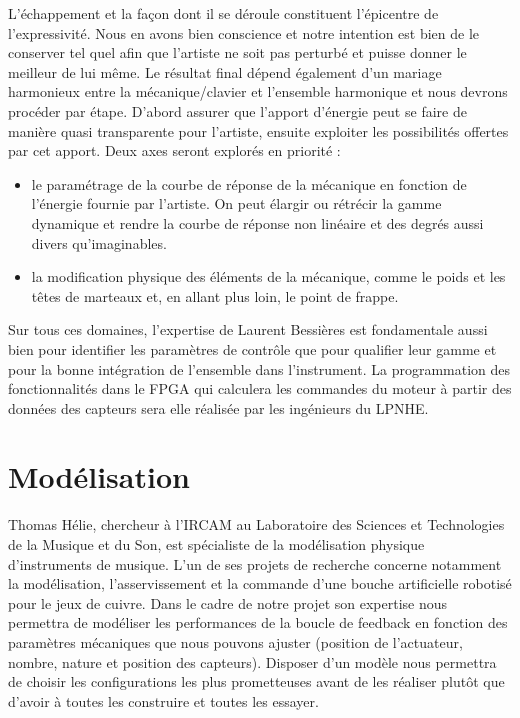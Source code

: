 \documentclass[french,a4paper,12pt]{report}
\begin{document}
L’échappement et la façon dont il se déroule constituent l’épicentre de l’expressivité. Nous en avons bien conscience et notre intention est bien de le conserver tel quel afin que l’artiste ne soit pas perturbé et puisse donner le meilleur de lui même. Le résultat final dépend également d’un mariage harmonieux entre la mécanique/clavier et l’ensemble harmonique et nous devrons procéder par étape. D’abord assurer que l’apport d’énergie peut se faire de manière quasi transparente pour l’artiste, ensuite exploiter les possibilités offertes par cet apport. Deux axes seront explorés en priorité :

\begin{itemize}
\item  le paramétrage de la courbe de réponse de la mécanique en fonction de l’énergie fournie par l’artiste. On peut élargir ou rétrécir la gamme dynamique et rendre la courbe de réponse non linéaire et des degrés aussi divers qu'imaginables.

\item  la modification physique des éléments de la mécanique, comme le poids et les têtes de marteaux et, en allant plus loin, le point de frappe.
\end{itemize}

Sur tous ces domaines, l’expertise de Laurent Bessières est fondamentale aussi bien pour identifier les paramètres de contrôle que pour qualifier leur gamme et pour la bonne intégration de l’ensemble dans l’instrument. La programmation des fonctionnalités dans le FPGA qui calculera les commandes du moteur à partir des données des capteurs sera elle réalisée par les ingénieurs du LPNHE.

\newpage

  \section{Modélisation}

Thomas Hélie, chercheur à l’IRCAM au Laboratoire des Sciences et Technologies de la Musique et du Son, est spécialiste de la modélisation physique d’instruments de musique. L’un de ses projets de recherche concerne notamment la modélisation, l’asservissement et la commande d’une bouche artificielle robotisé pour le jeux de cuivre. Dans le cadre de notre projet son expertise nous permettra de modéliser les performances de la boucle de feedback en fonction des paramètres mécaniques que nous pouvons ajuster (position de l’actuateur, nombre, nature et position des capteurs). Disposer d’un modèle nous permettra de choisir les configurations les plus prometteuses avant de les réaliser plutôt que d’avoir à toutes les construire et toutes les essayer.
\end{document}
